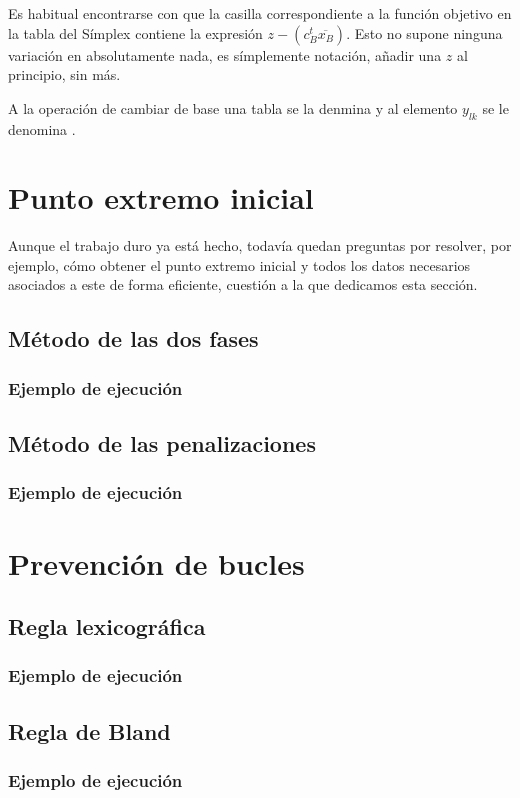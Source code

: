 \begin{obs}[Notación]
	Es habitual encontrarse con que la casilla correspondiente a la función objetivo en la tabla del Símplex contiene la expresión $z-(c_B^t\overline{x_B})$. Esto no supone ninguna variación en absolutamente nada, es símplemente notación, añadir una $z$ al principio, sin más.
\end{obs}

A la operación de cambiar de base una tabla se la denmina  y al elemento $y_{lk}$ se le denomina .
\section{Punto extremo inicial}
Aunque el trabajo duro ya está hecho, todavía quedan preguntas por resolver, por ejemplo, cómo obtener el punto extremo inicial y todos los datos necesarios asociados a este de forma eficiente, cuestión a la que dedicamos esta sección.
\subsection{Método de las dos fases}
\subsubsection{Ejemplo de ejecución}
\subsection{Método de las penalizaciones}
\subsubsection{Ejemplo de ejecución}
\section{Prevención de bucles}
\subsection{Regla lexicográfica}
\subsubsection{Ejemplo de ejecución}
\subsection{Regla de Bland}
\subsubsection{Ejemplo de ejecución}